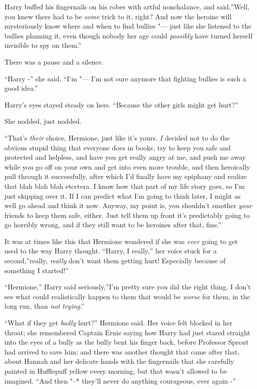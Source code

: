 Harry buffed his fingernails on his robes with artful nonchalance, and
said,''Well, you knew there had to be \emph{some} trick to it, right?
And now the heroine will mysteriously know where and when to find
bullies "--- just like she listened to the bullies planning it, even though
nobody her age could \emph{possibly} have turned herself invisible to
spy on them.''

There was a pause and a silence.

``Harry -'' she said. ``I'm "--- I'm not sure anymore that fighting bullies
is such a good idea.''

Harry's eyes stayed steady on hers. ``Because the other girls might get
hurt?''

She nodded, just nodded.

``That's \emph{their} choice, Hermione, just like it's yours. \emph{I}
decided not to do the obvious stupid thing that everyone does in books,
try to keep you safe and protected and helpless, and have you get really
angry at me, and push me away while you go off on your own and get into
even more trouble, and then heroically pull through it successfully,
after which I'd finally have my epiphany and realize that blah blah blah
etcetera. I know how that part of my life story goes, so I'm just
skipping over it. If I can predict what I'm going to think later, I
might as well go ahead and think it now. Anyway, my point is, you
shouldn't smother \emph{your} friends to keep them safe, either. Just
tell them up front it's predictably going to go horribly wrong, and if
they still want to be heroines after that, fine.''

It was at times like this that Hermione wondered if she was \emph{ever}
going to get used to the way Harry thought. ``Harry, I really,'' her
voice stuck for a second,''really, \emph{really} don't want them getting
hurt! Especially because of something I started!''

``Hermione,'' Harry said seriously,''I'm pretty sure you did the right
thing. I don't see what could realistically happen to them that would be
\emph{worse} for them, in the long run, than \emph{not trying}.''

``What if they get \emph{badly} hurt?'' Hermione said. Her voice felt
blocked in her throat; she remembered Captain Ernie saying how Harry had
just stared straight into the eyes of a bully as the bully bent his
finger back, before Professor Sprout had arrived to save him; and there
was another thought that came after that, about Hannah and her delicate
hands with the fingernails that she carefully painted in Hufflepuff
yellow every morning, but that wasn't allowed to be imagined. ``And then
"--* they'll never do anything courageous, ever again -''

